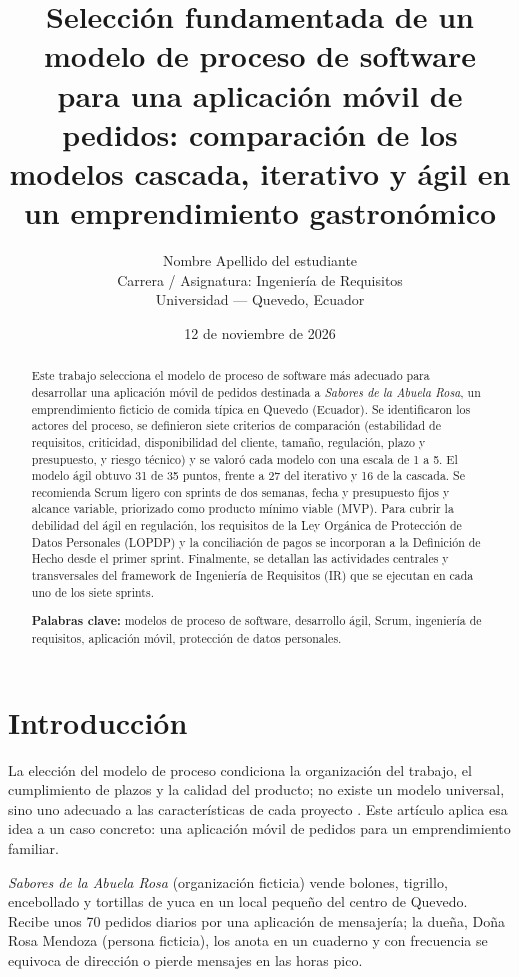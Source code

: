 \documentclass[11pt,a4paper]{article}
\title{\textbf{Selección fundamentada de un modelo de proceso de software
para una aplicación móvil de pedidos: comparación de los modelos
cascada, iterativo y ágil en un emprendimiento gastronómico}}
\author{%
  Nombre Apellido del estudiante\\[2pt]
  \small Carrera / Asignatura: Ingeniería de Requisitos\\
  \small Universidad --- Quevedo, Ecuador
}
\date{12 de noviembre de 2026}
\begin{document}
\maketitle
\thispagestyle{fancy}

\begin{abstract}
\noindent
Este trabajo selecciona el modelo de proceso de software más adecuado para
desarrollar una aplicación móvil de pedidos destinada a \emph{Sabores de la
Abuela Rosa}, un emprendimiento ficticio de comida típica en Quevedo
(Ecuador). Se identificaron los actores del proceso, se definieron siete
criterios de comparación (estabilidad de requisitos, criticidad,
disponibilidad del cliente, tamaño, regulación, plazo y presupuesto, y riesgo
técnico) y se valoró cada modelo con una escala de 1 a 5. El modelo ágil
obtuvo 31 de 35 puntos, frente a 27 del iterativo y 16 de la cascada. Se
recomienda Scrum ligero con sprints de dos semanas, fecha y presupuesto fijos
y alcance variable, priorizado como producto mínimo viable (MVP). Para cubrir
la debilidad del ágil en regulación, los requisitos de la Ley Orgánica de
Protección de Datos Personales (LOPDP) y la conciliación de pagos se
incorporan a la Definición de Hecho desde el primer sprint. Finalmente, se
detallan las actividades centrales y transversales del framework de
Ingeniería de Requisitos (IR) que se ejecutan en cada uno de los siete
sprints.

\medskip
\noindent\textbf{Palabras clave:} modelos de proceso de software, desarrollo
ágil, Scrum, ingeniería de requisitos, aplicación móvil, protección de datos
personales.
\end{abstract}

\section{Introducción}

La elección del modelo de proceso condiciona la organización del trabajo,
el cumplimiento de plazos y la calidad del producto; no existe un modelo
universal, sino uno adecuado a las características de cada proyecto
\cite{otavo2024,mex2025}. Este artículo aplica esa idea a un caso concreto:
una aplicación móvil de pedidos para un emprendimiento familiar.

\emph{Sabores de la Abuela Rosa} (organización ficticia) vende bolones,
tigrillo, encebollado y tortillas de yuca en un local pequeño del centro de
Quevedo. Recibe unos 70 pedidos diarios por una aplicación de mensajería;
la dueña, Doña Rosa Mendoza (persona ficticia), los anota en un cuaderno y
con frecuencia se equivoca de dirección o pierde mensajes en las horas pico.
\end{document}
